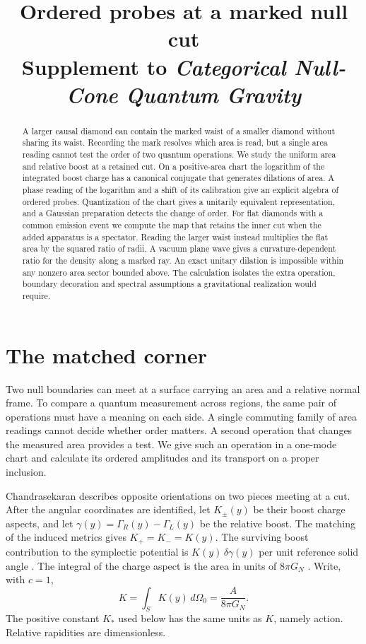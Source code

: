 \documentclass[11pt,letterpaper]{article}
\title{Ordered probes at a marked null cut\\[4pt]{\normalsize Supplement to \emph{Categorical Null-Cone Quantum Gravity}}}
\begin{document}
\maketitle

\begin{abstract}
A larger causal diamond can contain the marked waist of a smaller diamond without sharing its waist. Recording the mark resolves which area is read, but a single area reading cannot test the order of two quantum operations. We study the uniform area and relative boost at a retained cut. On a positive-area chart the logarithm of the integrated boost charge has a canonical conjugate that generates dilations of area. A phase reading of the logarithm and a shift of its calibration give an explicit algebra of ordered probes. Quantization of the chart gives a unitarily equivalent representation, and a Gaussian preparation detects the change of order. For flat diamonds with a common emission event we compute the map that retains the inner cut when the added apparatus is a spectator. Reading the larger waist instead multiplies the flat area by the squared ratio of radii. A vacuum plane wave gives a curvature-dependent ratio for the density along a marked ray. An exact unitary dilation is impossible within any nonzero area sector bounded above. The calculation isolates the extra operation, boundary decoration and spectral assumptions a gravitational realization would require.
\end{abstract}

\section{The matched corner}

Two null boundaries can meet at a surface carrying an area and a relative normal frame. To compare a quantum measurement across regions, the same pair of operations must have a meaning on each side. A single commuting family of area readings cannot decide whether order matters. A second operation that changes the measured area provides a test. We give such an operation in a one-mode chart and calculate its ordered amplitudes and its transport on a proper inclusion.

Chandrasekaran describes opposite orientations on two pieces meeting at a cut. After the angular coordinates are identified, let $K_\pm(y)$ be their boost charge aspects, and let $\gamma(y)=\Gamma_R(y)-\Gamma_L(y)$ be the relative boost. The matching of the induced metrics gives $K_+=K_-=K(y)$. The surviving boost contribution to the symplectic potential is $K(y)\,\delta\gamma(y)$ per unit reference solid angle \cite[Eqs.~(3.63) and (3.64)]{nc}. The integral of the charge aspect is the area in units of $8\pi G_N$ \cite[Eq.~(3.43)]{nc}. Write, with $c=1$,
\[
 K=\int_S K(y)\,d\Omega_0=\frac{A}{8\pi G_N}.
\]
The positive constant $K_*$ used below has the same units as $K$, namely action. Relative rapidities are dimensionless.
\end{document}
